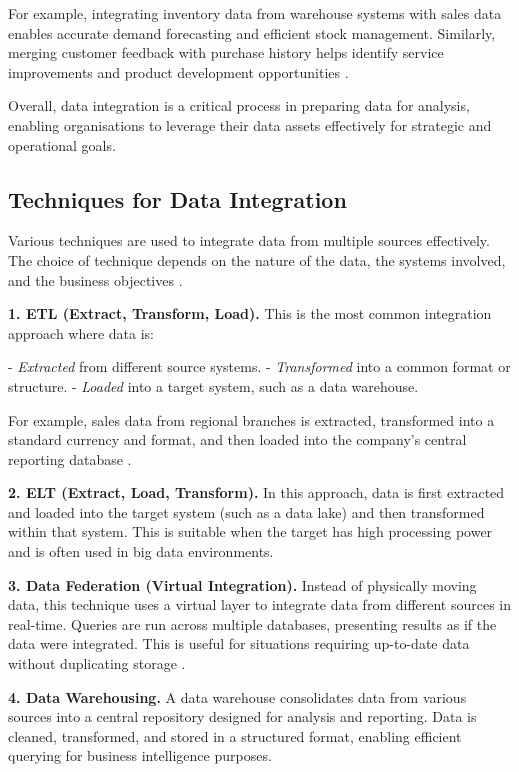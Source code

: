 For example, integrating inventory data from warehouse systems with sales data enables accurate demand forecasting and efficient stock management. Similarly, merging customer feedback with purchase history helps identify service improvements and product development opportunities \cite{hernandez1995merge}.

Overall, data integration is a critical process in preparing data for analysis, enabling organisations to leverage their data assets effectively for strategic and operational goals.

\subsection{Techniques for Data Integration}

Various techniques are used to integrate data from multiple sources effectively. The choice of technique depends on the nature of the data, the systems involved, and the business objectives \cite{singh2005survey}.

\textbf{1. ETL (Extract, Transform, Load).}  
This is the most common integration approach where data is:

- \emph{Extracted} from different source systems.  
- \emph{Transformed} into a common format or structure.  
- \emph{Loaded} into a target system, such as a data warehouse.

For example, sales data from regional branches is extracted, transformed into a standard currency and format, and then loaded into the company’s central reporting database \cite{vassiliadis2002etl}.

\textbf{2. ELT (Extract, Load, Transform).}  
In this approach, data is first extracted and loaded into the target system (such as a data lake) and then transformed within that system. This is suitable when the target has high processing power and is often used in big data environments.

\textbf{3. Data Federation (Virtual Integration).}  
Instead of physically moving data, this technique uses a virtual layer to integrate data from different sources in real-time. Queries are run across multiple databases, presenting results as if the data were integrated. This is useful for situations requiring up-to-date data without duplicating storage \cite{halevy2001answering}.

\textbf{4. Data Warehousing.}  
A data warehouse consolidates data from various sources into a central repository designed for analysis and reporting. Data is cleaned, transformed, and stored in a structured format, enabling efficient querying for business intelligence purposes.

